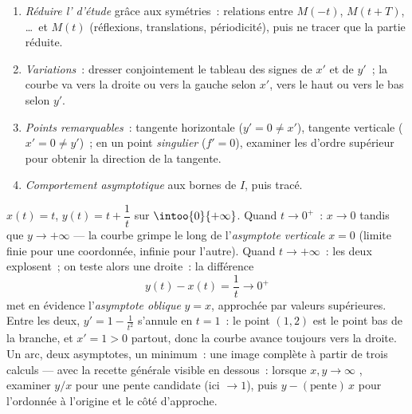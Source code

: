\begin{method}\label{met:b1:curves:study}
\begin{enumerate}
  \item \emph{Réduire l' d'étude} grâce aux symétries~:
        relations entre $M(-t)$, $M(t + T)$, \dots\ et $M(t)$
        (réflexions, translations, périodicité), puis ne tracer que
        la partie réduite.
  \item \emph{Variations}~: dresser conjointement le tableau des
        signes de $x'$ et de $y'$~; la courbe va vers la droite ou
        vers la gauche selon $x'$, vers le haut ou vers le bas selon $y'$.
  \item \emph{Points remarquables}~: tangente horizontale ($y' = 0
        \neq x'$), tangente verticale ($x' = 0 \neq y'$)~; en un
        point \emph{singulier} ($f' = 0$), examiner les 
        d'ordre supérieur pour obtenir la direction de la tangente.
  \item \emph{Comportement asymptotique} aux bornes de $I$, puis tracé.
\end{enumerate}
\end{method}

\begin{example}
\label{ex:b1:curves:asymptotes}
$x(t) = t$, $y(t) = t + \dfrac1t$ sur $\intoo{0}{+\infty}$. Quand $t
\to 0^{+}$~: $x \to 0$ tandis que $y \to +\infty$ --- la courbe
grimpe le long de l'\emph{asymptote verticale} $x = 0$ (limite finie
pour une coordonnée, infinie pour l'autre). Quand $t \to +\infty$~:
les deux  explosent~; on teste alors une droite~: la
différence
\[
y(t) - x(t) = \frac1t \longrightarrow 0^{+}
\]
met en évidence l'\emph{asymptote oblique} $y = x$, approchée par
valeurs supérieures. Entre les deux, $y' = 1 - \frac1{t^2}$ s'annule en $t = 1$~:
le point $(1, 2)$ est le point bas de la branche, et $x' = 1 >
0$ partout, donc la courbe avance toujours vers la droite. Un arc,
deux asymptotes, un minimum~: une image complète à partir de trois
calculs --- avec la recette générale visible en dessous~:
lorsque $x, y \to \infty$ , examiner $y/x$ pour une pente
candidate (ici $\to 1$), puis $y - (\text{pente})\,x$ pour
l'ordonnée à l'origine et le côté d'approche.
\end{example}

